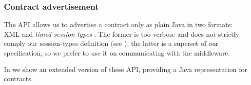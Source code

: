 \subsubsection{Contract advertisement}
The API allows us to advertise a contract only as plain Java
 in two formats: XML and \textit{timed
  session-types} \cite{Bartoletti15forte}. The former is too verbose
and does not strictly comply our session-types definition (see
); the latter is a superset of our
specification, so we prefer to use it on communicating with the
middleware.

In  we show an extended version of these API,
providing a Java representation for contracts.

